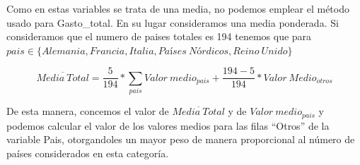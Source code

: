 \documentclass[data,article,submit,moreauthors,pdftex]{Definitions/mdpi}
\newenvironment{Shaded}{\begin{snugshade}}{\end{snugshade}}
\newcommand{\CommentTok}[1]{\textcolor[rgb]{0.56,0.35,0.01}{\textit{#1}}}
\newcommand{\ControlFlowTok}[1]{\textcolor[rgb]{0.13,0.29,0.53}{\textbf{#1}}}
\newcommand{\DecValTok}[1]{\textcolor[rgb]{0.00,0.00,0.81}{#1}}
\newcommand{\FunctionTok}[1]{\textcolor[rgb]{0.13,0.29,0.53}{\textbf{#1}}}
\newcommand{\NormalTok}[1]{#1}
\newcommand{\OtherTok}[1]{\textcolor[rgb]{0.56,0.35,0.01}{#1}}
\newcommand{\SpecialCharTok}[1]{\textcolor[rgb]{0.81,0.36,0.00}{\textbf{#1}}}
\newcommand{\StringTok}[1]{\textcolor[rgb]{0.31,0.60,0.02}{#1}}
\begin{document}
Como en estas variables se trata de una media, no podemos emplear el
método usado para Gasto\_total. En su lugar consideramos una media
ponderada. Si consideramos que el numero de paises totales es 194
tenemos que para
\(pais \in \{Alemania, Francia,Italia, Países\ Nórdicos, Reino\ Unido\}\)

\[
 \overline{Media\ Total} = \frac{5}{194}*\sum_{pais}{Valor\ medio}_{pais} + \frac{194-5}{194}*Valor \ Medio_{otros}
\]

De esta manera, concemos el valor de \(\overline{Media\ Total}\) y de
\({Valor\ medio}_{pais}\) y podemos calcular el valor de los valores
medios para las filas ``Otros'' de la variable Pais, otorgandoles un
mayor peso de manera proporcional al número de países considerados en
esta categoría.

\begin{Shaded}
\end{Shaded}
\end{document}
